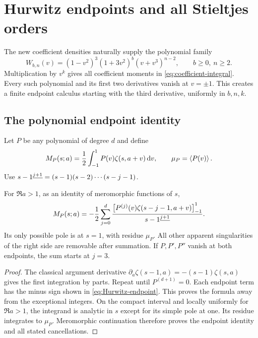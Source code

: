 \section{Hurwitz endpoints and all Stieltjes orders}
\label{sec:hurwitz}

The new coefficient densities naturally supply the polynomial family
\begin{equation}\label{eq:Wkernel}
 W_{b,n}(v)=(1-v^2)^3(1+3v^2)^b(v+v^3)^{n-2},
 \qquad b\ge0,\ n\ge2.
\end{equation}
Multiplication by $v^k$ gives all coefficient moments in
\eqref{eq:coefficient-integral}. Every such polynomial and its first two
derivatives vanish at $v=\pm1$. This creates a finite endpoint calculus
starting with the third derivative, uniformly in $b,n,k$.

\subsection{The polynomial endpoint identity}
Let $P$ be any polynomial of degree $d$ and define
\[
 M_P(s;a)=\frac12\int_{-1}^1P(v)\zeta(s,a+v)\,\mathrm d v,
 \qquad \mu_P=\left\langle P(v)\right\rangle.
\]
Use $s-1^{\underline{j+1}}=(s-1)(s-2)\cdots(s-j-1)$.

\begin{proposition}\label{prop:Hurwitz}
For $\Re a>1$, as an identity of meromorphic functions of $s$,
\begin{equation}\label{eq:Hurwitz-endpoint}
 M_P(s;a)=-\frac12\sum_{j=0}^d
 \frac{\left[P^{(j)}(v)\zeta(s-j-1,a+v)\right]_{-1}^{1}}{s-1^{\underline{j+1}}}.
\end{equation}
Its only possible pole is at $s=1$, with residue $\mu_P$.
All other apparent singularities of the right side are removable after
summation. If $P,P',P''$ vanish at both endpoints, the sum starts at
$j=3$.
\end{proposition}
\begin{proof}
The classical argument derivative
$\partial_a\zeta(s-1,a)=-(s-1)\zeta(s,a)$
\cite{DLMF25} gives the first integration by parts. Repeat until
$P^{(d+1)}=0$. Each endpoint term has the minus sign shown in
\eqref{eq:Hurwitz-endpoint}. This proves the formula away from the
exceptional integers. On the compact interval and locally uniformly for
$\Re a>1$, the integrand is analytic in $s$ except for its simple
pole at one. Its residue integrates to $\mu_P$. Meromorphic continuation
therefore proves the endpoint identity and all stated cancellations.
\end{proof}

